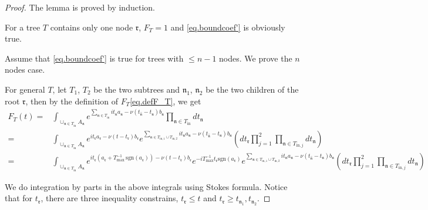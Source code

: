 \begin{proof} The lemma is proved by induction.

For a tree $T$ contains only one node $\mathfrak{r}$, $F_{T}=1$ and \eqref{eq.boundcoef'} is obviously true.

Assume that \eqref{eq.boundcoef'} is true for trees with $\le n-1$ nodes. We prove the $n$ nodes case. 

For general $T$, let $T_1$, $T_2$ be the two subtrees and $\mathfrak{n}_1$, $\mathfrak{n}_2$ be the two children of the root $\mathfrak{r}$, then by the definition of $F_T$\eqref{eq.defF_T}, we get
\begin{equation}\label{eq.lemboundcoef'1}
\begin{split}
    F_{T}(t)=&\int_{\cup_{\mathfrak{n}\in T_{\text{in}}} A_{\mathfrak{n}}} e^{\sum_{\mathfrak{n}\in T_{\text{in}}}it_{\mathfrak{n}} a_{\mathfrak{n}} - \nu(t_{\widehat{\mathfrak{n}}}-t_{\mathfrak{n}})b_{\mathfrak{n}}} \prod_{\mathfrak{n}\in T_{\text{in}}} dt_{\mathfrak{n}}    
    \\
    =&\int_{\cup_{\mathfrak{n}\in T_{\text{in}}} A_{\mathfrak{n}}}e^{it_{\mathfrak{r}} a_{\mathfrak{r}} - \nu(t-t_{\mathfrak{r}})b_{\mathfrak{r}}} e^{\sum_{\mathfrak{n}\in T_{\text{in},1}\cup T_{\text{in},2}} it_{\mathfrak{n}} a_{\mathfrak{n}} - \nu(t_{\widehat{\mathfrak{n}}}-t_{\mathfrak{n}})b_{\mathfrak{n}}}  \left(dt_{\mathfrak{r}}\prod_{j=1}^2\prod_{\mathfrak{n}\in T_{\text{in},j}}dt_{\mathfrak{n}}  \right)
    \\
    =&\int_{\cup_{\mathfrak{n}\in T_{\text{in}}} A_{\mathfrak{n}}}e^{it_{\mathfrak{r}}(a_{\mathfrak{r}}+T^{-1}_{\text{max}}\, \text{sgn}(a_{\mathfrak{r}}))- \nu(t-t_{\mathfrak{r}})b_{\mathfrak{r}}} e^{-iT^{-1}_{\text{max}}t_{\mathfrak{r}} \text{sgn}(a_{\mathfrak{r}})} e^{\sum_{\mathfrak{n}\in T_{\text{in},1}\cup T_{\text{in},2}} it_{\mathfrak{n}} a_{\mathfrak{n}} - \nu(t_{\widehat{\mathfrak{n}}}-t_{\mathfrak{n}})b_{\mathfrak{n}}}  \left(dt_{\mathfrak{r}}\prod_{j=1}^2\prod_{\mathfrak{n}\in T_{\text{in},j}}dt_{\mathfrak{n}}  \right)
\end{split}
\end{equation}



We do integration by parts in the above integrals using Stokes formula. Notice that for $t_{\mathfrak{r}}$, there are three inequality constrains, $t_{\mathfrak{r}}\le t$ and $t_{\mathfrak{r}}\ge t_{\mathfrak{n}_1},t_{\mathfrak{n}_2}$. 



\end{proof}
